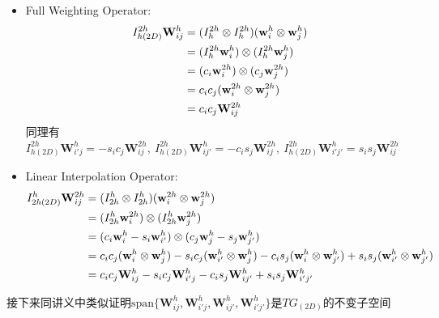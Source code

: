 \documentclass{article}
\begin{document}
\begin{itemize}
    \item Full Weighting Operator:
    \begin{align}
        I_{h(2D)}^{2h}\mathbf{W}_{ij}^h
        & = (I_{h}^{2h}\otimes I_{h}^{2h})(\mathbf{w}_i^h\otimes\mathbf{w}_j^h) \notag \\
        & = (I_{h}^{2h}\mathbf{w}_i^h)\otimes(I_{h}^{2h}\mathbf{w}_j^h) \notag \\
        & = (c_i\mathbf{w}_i^{2h})\otimes(c_j\mathbf{w}_j^{2h}) \notag \\
        & = c_ic_j(\mathbf{w}_i^{2h}\otimes\mathbf{w}_j^{2h}) \notag \\
        & = c_ic_j\mathbf{W}_{ij}^{2h} \notag
    \end{align}
    同理有$I_{h(2D)}^{2h}\mathbf{W}_{i'j}^h = -s_ic_j\mathbf{W}_{ij}^{2h},\ I_{h(2D)}^{2h}\mathbf{W}_{ij'}^h = -c_is_j\mathbf{W}_{ij}^{2h},\ I_{h(2D)}^{2h}\mathbf{W}_{i'j'}^h = s_is_j\mathbf{W}_{ij}^{2h}$
    \item Linear Interpolation Operator:
    \begin{align}
        I_{2h(2D)}^h\mathbf{W}_{ij}^{2h}
        & = (I_{2h}^{h}\otimes I_{2h}^{h})(\mathbf{w}_i^{2h}\otimes\mathbf{w}_j^{2h}) \notag \\
        & = (I_{2h}^{h}\mathbf{w}_i^{2h})\otimes(I_{2h}^{h}\mathbf{w}_j^{2h}) \notag \\
        & = (c_i\mathbf{w}_i^{h}-s_i\mathbf{w}_{i'}^{h})\otimes(c_j\mathbf{w}_j^{h}-s_j\mathbf{w}_{j'}^{h}) \notag \\
        & = c_ic_j(\mathbf{w}_i^{h}\otimes\mathbf{w}_j^{h})-s_ic_j(\mathbf{w}_{i'}^{h}\otimes\mathbf{w}_j^{h})-c_is_j(\mathbf{w}_{i}^{h}\otimes\mathbf{w}_{j'}^{h})+s_is_j(\mathbf{w}_{i'}^{h}\otimes\mathbf{w}_{j'}^{h}) \notag \\
        & = c_ic_j\mathbf{W}_{ij}^h-s_ic_j\mathbf{W}_{i'j}^h-c_is_j\mathbf{W}_{ij'}^h+s_is_j\mathbf{W}_{i'j'}^h \notag 
    \end{align}
\end{itemize}

接下来同讲义中类似证明$\text{span}\{\mathbf{W}_{ij}^h,\mathbf{W}_{i'j}^h,\mathbf{W}_{ij'}^h,\mathbf{W}_{i'j'}^h\}$是$TG_{(2D)}$的不变子空间
\end{document}
